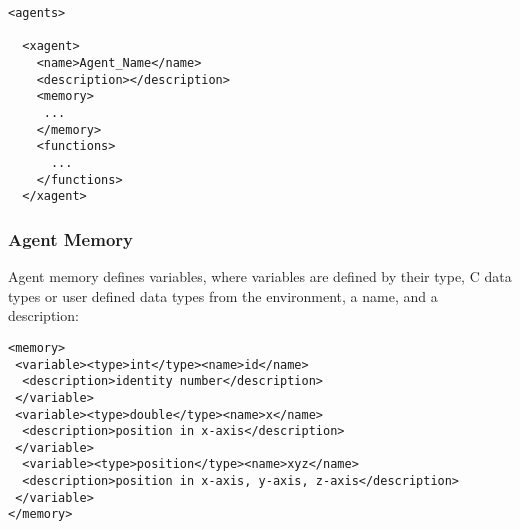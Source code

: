 \begin{mylisting}
\begin{verbatim}
<agents>

  <xagent>
    <name>Agent_Name</name>
    <description></description>
    <memory>
     ...
    </memory>
    <functions>
      ...
    </functions>
  </xagent>
\end{verbatim}
\end{mylisting}
%


\subsubsection{Agent Memory}

Agent memory defines variables, where variables are defined by their type, C
data types or user defined data types from the environment, a name, and a
description:

\begin{mylisting}
\begin{verbatim}
<memory>
 <variable><type>int</type><name>id</name>
  <description>identity number</description>
 </variable>
 <variable><type>double</type><name>x</name>
  <description>position in x-axis</description>
 </variable>
  <variable><type>position</type><name>xyz</name>
  <description>position in x-axis, y-axis, z-axis</description>
 </variable>
</memory>
\end{verbatim}
\end{mylisting}

